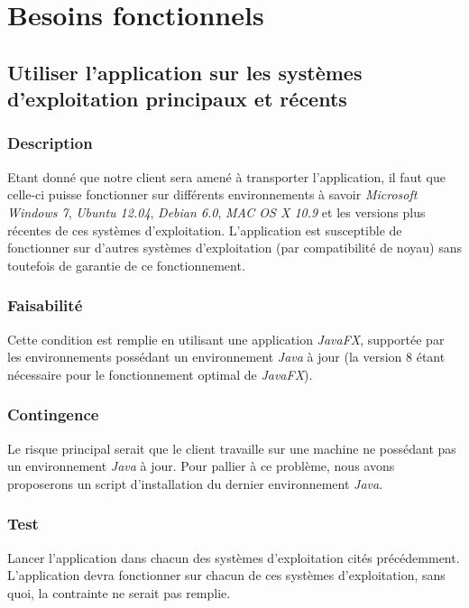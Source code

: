 \section{Besoins fonctionnels}\label{besoins_fonctionnels}

\subsection{Utiliser l’application sur les systèmes d’exploitation principaux et récents}\label{systems}

\subsubsection{Description}

Etant donné que notre client sera amené à transporter l’application, il faut que celle-ci puisse fonctionner sur différents environnements à savoir \textit{Microsoft Windows 7}, \textit{Ubuntu 12.04}, \textit{Debian 6.0}, \textit{MAC OS X 10.9} et les versions plus récentes de ces systèmes d’exploitation.
L’application est susceptible de fonctionner sur d’autres systèmes d’exploitation (par compatibilité de noyau) sans toutefois de garantie de ce fonctionnement.

\subsubsection{Faisabilité}

Cette condition est remplie en utilisant une application \textit{JavaFX}, supportée par les environnements possédant un environnement \textit{Java} à jour (la version 8 étant nécessaire pour le fonctionnement optimal de \textit{JavaFX}).

\subsubsection{Contingence}

Le risque principal serait que le client travaille sur une machine ne possédant pas un environnement \textit{Java} à jour. Pour pallier à ce problème, nous avons proposerons un script d'installation du dernier environnement \textit{Java}.

\subsubsection{Test}

Lancer l'application dans chacun des systèmes d’exploitation cités précédemment. L'application devra fonctionner sur chacun de ces systèmes d'exploitation, sans quoi, la contrainte ne serait pas remplie.

